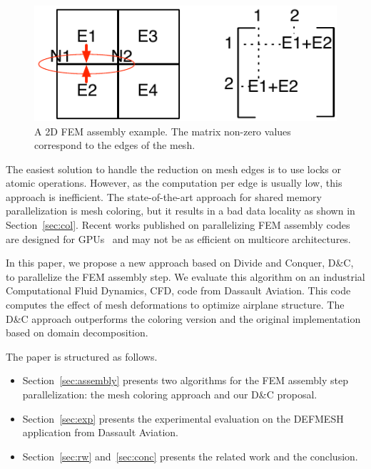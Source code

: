 \documentclass[10pt]{IOS-Book-Article}
\begin{document}
\begin{figure}[tp]
 \includegraphics[scale=0.6]{FEM_ass.pdf}
 \caption{A 2D FEM assembly example. The matrix non-zero values correspond to the edges of the mesh.}
 \label{fig:2Dasm}
\end{figure}

The easiest solution to handle the reduction on mesh edges is to use locks or atomic operations.
However, as the computation per edge is usually low, this approach is inefficient.
The state-of-the-art approach for shared memory parallelization is mesh coloring, but it results in a bad data locality as shown in Section~\ref{sec:col}. Recent works published on parallelizing FEM assembly codes are designed for GPUs~\cite{cecka2011assembly,CPUGPUasm}
and may not be as efficient on multicore architectures.


In this paper, we propose a new approach based on Divide and Conquer, D\&C, to parallelize the FEM assembly step.
We evaluate this algorithm on an industrial Computational Fluid Dynamics, CFD, code from Dassault Aviation.
This code computes the effect of mesh deformations to optimize airplane structure.
The D\&C approach outperforms the coloring version and the original implementation based on domain decomposition.

The paper is structured as follows.
\begin{itemize}
\item Section~\ref{sec:assembly} presents  two algorithms for the FEM assembly step parallelization: the mesh coloring approach and our D\&C proposal.
\item Section~\ref{sec:exp} presents the experimental evaluation on the DEFMESH application from Dassault Aviation.
\item Section~\ref{sec:rw} and~\ref{sec:conc} presents the related work and the conclusion.
\end{itemize}

\end{document}
